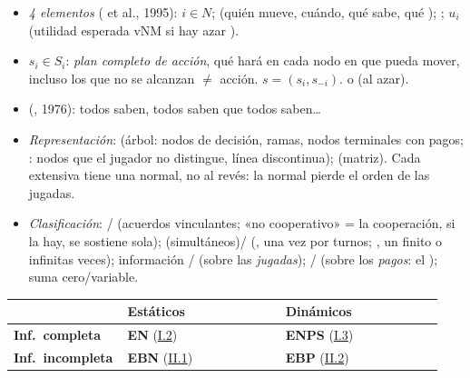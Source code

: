 \documentclass{article}
\begin{document}
\begin{columnas}
\begin{itemize}
\item \emph{4 elementos} ( et al., 1995):  $i\in N$;  (quién mueve, cuándo, qué sabe, qué ); ;  $u_i$ (utilidad esperada vNM si hay azar ).
\item {} $s_i\in S_i$: \emph{plan completo de acción}, qué hará en cada nodo en que pueda mover, incluso los que no se alcanzan $\neq$ acción.  $s=(s_i,s_{-i})$.  o  (al azar).
\item {} (, 1976): todos saben, todos saben que todos saben\ldots
\item \emph{Representación}:  (árbol: nodos de decisión, ramas, nodos terminales con pagos; : nodos que el jugador no distingue, línea discontinua);  (matriz). Cada extensiva tiene una normal, no al revés: la normal pierde el orden de las jugadas.
\item \emph{Clasificación}: / (acuerdos vinculantes; «no cooperativo» = la cooperación, si la hay, se sostiene sola);  (simultáneos)/ (, una vez por turnos; , un  finito o infinitas veces); información / (sobre las \emph{jugadas}); / (sobre los \emph{pagos}: el ); suma cero/variable.
\end{itemize}
{\centering\small\renewcommand{\arraystretch}{1.1}\setlength{\tabcolsep}{2.5pt}%
\begin{tabular}{@{}>{\centering\arraybackslash}m{0.22\linewidth}>{\centering\arraybackslash}m{0.36\linewidth}>{\centering\arraybackslash}m{0.36\linewidth}@{}}
\toprule
\rowcolor{tceeazulpalido} & \textbf{Estáticos} & \textbf{Dinámicos}\\
\midrule
\textbf{Inf.\ completa} & \cellcolor{tceesalvia}\textcolor{tceeverde}{\textbf{EN}} (\hyperref[rep:I.2]{I.2}) & \cellcolor{tceesalvia}\textcolor{tceeverde}{\textbf{ENPS}} (\hyperref[rep:I.3]{I.3})\\
\textbf{Inf.\ incompleta} & \cellcolor{tceesalvia}\textcolor{tceedorado}{\textbf{EBN}} (\hyperref[rep:II.1]{II.1}) & \cellcolor{tceesalvia}\textcolor{tceedorado}{\textbf{EBP}} (\hyperref[rep:II.2]{II.2})\\

\end{tabular}}
\end{columnas}
\end{document}
